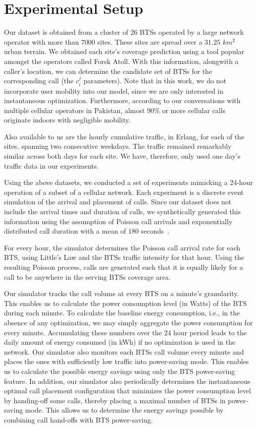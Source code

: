 \section{Experimental Setup}
\label{sec:expermintalsetup}
Our dataset is obtained from a cluster of 26 BTSs operated by a large network operator with more than 7000 sites. These sites are spread over a $31.25$ $km^2$ urban terrain. We obtained each site's coverage prediction using a tool popular amongst the operators called Forsk Atoll. With this information, alongwith a caller's location, we can determine the candidate set of BTSs for the corresponding call (the $c_i^j$ parameters). Note that in this work, we do not incorporate user mobility into our model, since we are only interested in instantaneous optimization. Furthermore, according to our conversations with multiple cellular operators in Pakistan, almost 90\% or more cellular calls originate indoors with negligible mobility.

Also available to us are the hourly cumulative traffic, in Erlang, for each of the sites, spanning two consecutive weekdays. The traffic remained remarkably similar across both days for each site. We have, therefore, only used one day's traffic data in our experiments.

Using the above datasets, we conducted a set of experiments mimicking a 24-hour operation of a subset of a cellular network. Each experiment is a discrete event simulation of the arrival and placement of calls. Since our dataset does not include the arrival times and duration of calls, we synthetically generated this information using the assumption of Poisson call arrivals and exponentially distributed call duration with a mean of $180$ seconds~\cite{Gerla:1995:MMM:276418.276421}.

For every hour, the simulator determines the Poisson call arrival rate for each BTS, using Little's Law and the BTSs traffic intensity for that hour. Using the resulting Poisson process, calls are generated such that it is equally likely for a call to be anywhere in the serving BTSs coverage area.

Our simulator tracks the call volume at every BTS on a minute's granularity. This enables us to calculate the power consumption level (in Watts) of the BTS during each minute. To calculate the baseline energy consumption, i.e., in the absence of any optimization, we may simply aggregate the power consumption for every minute. Accumulating these numbers over the 24 hour period leads to the daily amount of energy consumed (in kWh) if no optimization is used in the network. Our simulator also monitors each BTSs call volume every minute and places the ones with sufficiently low traffic into power-saving mode. This enables us to calculate the possible energy savings using only the BTS power-saving feature. In addition, our simulator also periodically determines the instantaneous optimal call placement configuration that minimizes the power consumption level by handing-off some calls, thereby placing a maximal number of BTSs in power-saving mode. This allows us to determine the energy savings possible by combining call hand-offs with BTS power-saving.

